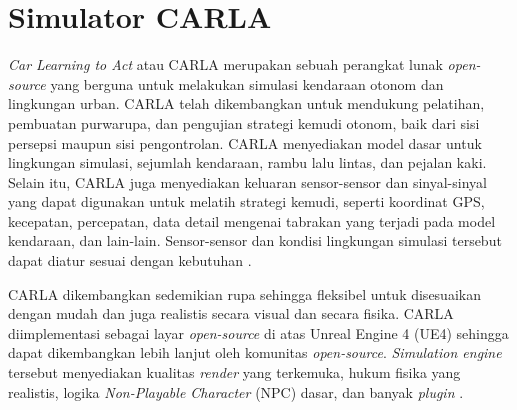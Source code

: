 

\section{Simulator CARLA}

\textit{Car Learning to Act} atau CARLA merupakan sebuah perangkat lunak
\textit{open-source} yang berguna untuk melakukan simulasi kendaraan otonom dan
lingkungan urban. CARLA telah dikembangkan untuk mendukung pelatihan, pembuatan
purwarupa, dan pengujian strategi kemudi otonom, baik dari sisi persepsi maupun
sisi pengontrolan. CARLA menyediakan model dasar untuk lingkungan simulasi,
sejumlah kendaraan, rambu lalu lintas, dan pejalan kaki. Selain itu, CARLA juga
menyediakan keluaran sensor-sensor dan sinyal-sinyal yang dapat digunakan untuk
melatih strategi kemudi, seperti koordinat GPS, kecepatan, percepatan, data
detail mengenai tabrakan yang terjadi pada model kendaraan, dan lain-lain.
Sensor-sensor dan kondisi lingkungan simulasi tersebut dapat diatur sesuai
dengan kebutuhan \parencite{carla-dosovitskiy}.

CARLA dikembangkan sedemikian rupa sehingga fleksibel untuk disesuaikan dengan
mudah dan juga realistis secara visual dan secara fisika. CARLA diimplementasi
sebagai layar \textit{open-source} di atas Unreal Engine 4 (UE4) sehingga dapat
dikembangkan lebih lanjut oleh komunitas \textit{open-source}.
\textit{Simulation engine} tersebut menyediakan kualitas \textit{render} yang
terkemuka, hukum fisika yang realistis, logika \textit{Non-Playable Character}
(NPC) dasar, dan banyak \textit{plugin} \parencite{carla-dosovitskiy}.

